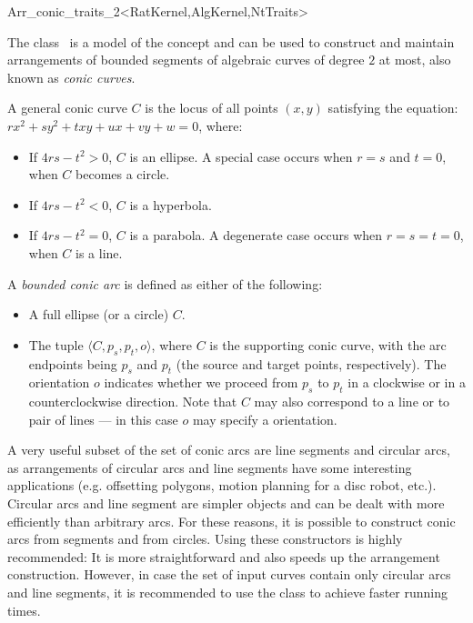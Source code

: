
\ccRefPageBegin
\begin{ccRefClass}{Arr_conic_traits_2<RatKernel,AlgKernel,NtTraits>}

\ccDefinition

The class \ccRefName\ is a model of the  concept
and can be used to construct and maintain arrangements of bounded segments of
algebraic curves of degree $2$ at most, also known as {\sl conic curves}.

A general conic curve $C$ is the locus of all points $(x,y)$ satisfying the
equation: $r x^2 + s y^2 + t x y + u x + v y + w = 0$, where: 
\begin{itemize}
\item If $4 r s - t^2 > 0$, $C$ is an ellipse.
      A special case occurs when $r = s$ and $t = 0$, when $C$
      becomes a circle. 
\item If $4 r s - t^2 < 0$, $C$ is a hyperbola. 
\item If $4 r s - t^2 = 0$, $C$ is a parabola.
      A degenerate case occurs when $r = s = t = 0$, when $C$ is a line.
\end{itemize}

A {\sl bounded conic arc} is defined as either of the following: 
\begin{itemize}
\item A full ellipse (or a circle) $C$. 
\item The tuple $\langle C, p_s, p_t, o \rangle$, where $C$ is the supporting
      conic curve, with the arc endpoints being $p_s$ and $p_t$ 
      (the source and target points, respectively). The orientation $o$  
      indicates whether we proceed from $p_s$ to $p_t$ in a clockwise or in a
      counterclockwise direction. Note that $C$ may also
      correspond to a line or to pair of lines --- in this case $o$ may
      specify a  orientation.
\end{itemize}

A very useful subset of the set of conic arcs are line segments and circular
arcs, as arrangements of circular arcs and line segments have some
interesting applications (e.g. offsetting polygons, motion planning for a
disc robot, etc.). Circular arcs and line segment are simpler objects and can
be dealt with more efficiently than arbitrary arcs. For these reasons, it is
possible to construct conic arcs from segments and from circles. Using these
constructors is highly recommended: It is more straightforward and also speeds 
up the arrangement  construction. However, in case the set of input curves
contain only circular arcs and line segments, it is recommended to use the
 class to achieve faster running times.


\end{ccRefClass}
